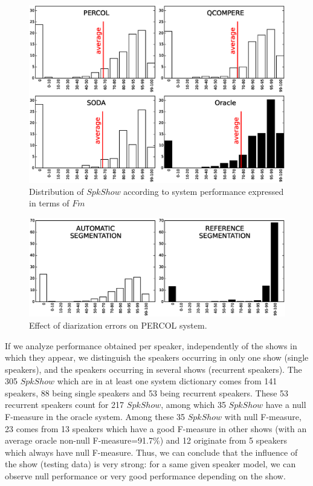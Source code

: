 \begin{figure}[t]
\centering
\includegraphics[width=\linewidth]{figures/bimodal.eps}
\caption{Distribution of $SpkShow$ according to system performance expressed in terms of $Fm$}
\label{fig:FMeasureDistribution}
\end{figure}


\begin{figure}[t]
\centering
\includegraphics[width=\linewidth]{figures/ref.eps}
\caption{Effect of diarization errors on PERCOL system.}
\label{fig:autoVSref}
\end{figure}

If we analyze performance obtained per speaker, independently of the shows in which they appear, we distinguish the speakers occurring in only one show (single speakers), and the speakers occurring in several shows (recurrent speakers). The 305 $SpkShow$ which are in at least one system dictionary comes from 141 speakers, 88 being single speakers and 53 being recurrent speakers. These 53 recurrent speakers count for 217 $SpkShow$, among which 35 $SpkShow$ have a null F-measure in the oracle system. Among these 35 $SpkShow$ with null F-measure, 23 comes from 13 speakers which have a good F-measure in other shows (with an average oracle non-null F-measure=91.7\%) and 12 originate from 5 speakers which always have null F-measure. Thus, we can conclude that the influence of the show (testing data) is very strong: for a same given speaker model, we can observe null performance or very good performance depending on the show.
 
